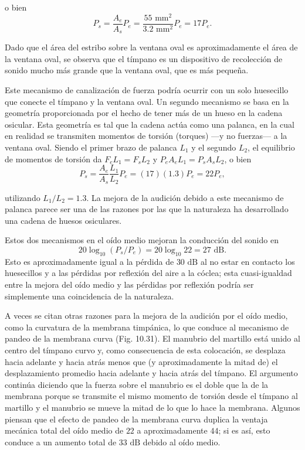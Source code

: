 \documentclass[12pt]{book}
\begin{document}
o bien
\begin{equation}
P_s = \frac{A_e}{A_s} P_e = \frac{55\text{ mm}^2}{3.2\text{ mm}^2} P_e = 17 P_e.
\label{eq:10.54}
\end{equation}

Dado que el área del estribo sobre la ventana oval es aproximadamente el área de la ventana oval, se observa que el tímpano es un dispositivo de recolección de sonido mucho más grande que la ventana oval, que es más pequeña.

Este mecanismo de canalización de fuerza podría ocurrir con un solo huesecillo que conecte el tímpano y la ventana oval. Un segundo mecanismo se basa en la geometría proporcionada por el hecho de tener más de un hueso en la cadena osicular. Esta geometría es tal que la cadena actúa como una palanca, en la cual en realidad se transmiten momentos de torsión (torques) ---y no fuerzas--- a la ventana oval. Siendo el primer brazo de palanca $L_1$ y el segundo $L_2$, el equilibrio de momentos de torsión da $F_e L_1 = F_s L_2$ y $P_e A_e L_1 = P_s A_s L_2$, o bien
\begin{equation}
P_s = \frac{A_e}{A_s} \frac{L_1}{L_2} P_e = (17)(1.3) P_e = 22 P_e,
\label{eq:10.55}
\end{equation}

utilizando $L_1/L_2 = 1.3$. La mejora de la audición debido a este mecanismo de palanca parece ser una de las razones por las que la naturaleza ha desarrollado una cadena de huesos osiculares.

Estos dos mecanismos en el oído medio mejoran la conducción del sonido en
\begin{equation*}
20 \log_{10}(P_s/P_e) = 20 \log_{10} 22 = 27\text{ dB}.
\end{equation*}
Esto es aproximadamente igual a la pérdida de $30\text{ dB}$ al no estar en contacto los huesecillos y a las pérdidas por reflexión del aire a la cóclea; esta cuasi-igualdad entre la mejora del oído medio y las pérdidas por reflexión podría ser simplemente una coincidencia de la naturaleza.

A veces se citan otras razones para la mejora de la audición por el oído medio, como la curvatura de la membrana timpánica, lo que conduce al mecanismo de pandeo de la membrana curva (Fig. 10.31). El manubrio del martillo está unido al centro del tímpano curvo y, como consecuencia de esta colocación, se desplaza hacia adelante y hacia atrás menos que (y aproximadamente la mitad de) el desplazamiento promedio hacia adelante y hacia atrás del tímpano. El argumento continúa diciendo que la fuerza sobre el manubrio es el doble que la de la membrana porque se transmite el mismo momento de torsión desde el tímpano al martillo y el manubrio se mueve la mitad de lo que lo hace la membrana. Algunos piensan que el efecto de pandeo de la membrana curva duplica la ventaja mecánica total del oído medio de $22$ a aproximadamente $44$; si es así, esto conduce a un aumento total de $33\text{ dB}$ debido al oído medio.
\end{document}
